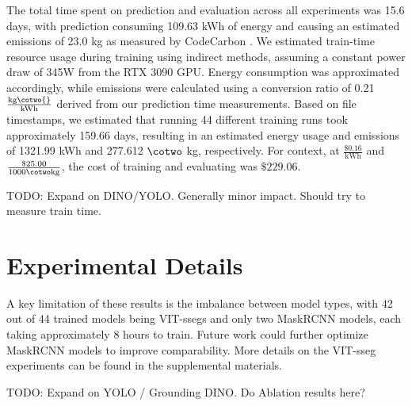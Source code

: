 The total time spent on prediction and evaluation across all experiments was 15.6 days, with prediction
  consuming 109.63 kWh of energy and causing an estimated emissions of 23.0 \cotwo kg as measured by
  CodeCarbon \cite{lacoste2019codecarbon}.
We estimated train-time resource usage during training using indirect methods, assuming a constant power
  draw of 345W from the RTX 3090 GPU.
Energy consumption was approximated accordingly, while emissions were calculated using a conversion
  ratio of 0.21 $\frac{\textrm{kg}\cotwo{}}{\textrm{kWh}}$ derived from our prediction time measurements.
Based on file timestamps, we estimated that running 44 different training runs took approximately 159.66
  days, resulting in an estimated energy usage and emissions of 1321.99 kWh and 277.612 $\cotwo$ kg,
  respectively.
For context, at $\frac{\$0.16}{\textrm{kWh}}$ and $\frac{\$25.00}{1000 \cotwo \textrm{kg}}$, the cost of training
  and evaluating was $\$229.06$.

TODO: Expand on DINO/YOLO. Generally minor impact. Should try to measure train time.


\section{Experimental Details} 
\label{sec:experiment_details}
A key limitation of these results is the imbalance between model types, with 42 out of 44 trained models
  being VIT-ssegs and only two MaskRCNN models, each taking approximately 8 hours to train.
Future work could further optimize MaskRCNN models to improve comparability.
More details on the VIT-sseg experiments can be found in the supplemental materials.

TODO: Expand on YOLO / Grounding DINO. Do Ablation results here?
